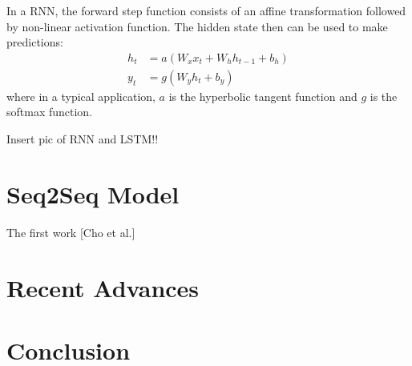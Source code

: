 \documentclass[12pt]{extarticle}
\begin{document}
In a RNN, the forward step function consists of an affine transformation followed by non-linear activation function. The hidden state then can be used to make predictions:
\begin{align*}
h_{t} &= a(W_{x}x_{t} + W_{h}h_{t-1} + b_{h})\\
y_{t} &= g(W_{y}h_{t} + b_{y}) 
\end{align*}
where in a typical application, $a$ is the hyperbolic tangent function and $g$ is the softmax function.

Insert pic of RNN and LSTM!!




\section*{Seq2Seq Model}
The first work [Cho et al.]

\section*{Recent Advances} %

\section*{Conclusion}
\end{document}
